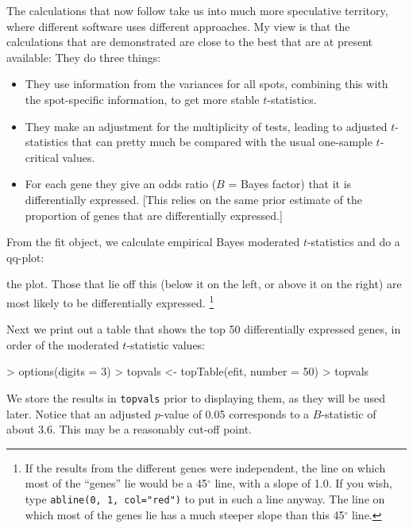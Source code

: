 \documentclass[a4paper,9pt]{article}
\begin{document}
The calculations that now follow take us into much more speculative
territory, where different software uses different approaches.
My view is that the calculations that are demonstrated are close
to the best that are at present available:  They do three things:
\begin{itemize}
\item They use information from the variances for all spots,
combining this with the spot-specific information, to get
more stable $t$-statistics.
\item They make an adjustment for the multiplicity of tests,
leading to adjusted $t$-statistics that can pretty much be
compared with the usual one-sample $t$-critical values.
\item For each gene they give an odds ratio ($B$ = Bayes factor) that
      it is differentially expressed.  [This relies on the same prior
      estimate of the proportion of genes that are differentially
      expressed.]
\end{itemize}

From the fit object, we calculate empirical Bayes moderated 
$t$-statistics and do a qq-plot:
\begin{Schunk}
\end{Schunk}
the plot.  Those that lie off this (below it on the left, or above it
on the right) are most likely to be differentially expressed.
\footnote{If the results from the different genes were independent,
the line on which most of the ``genes'' lie would be a 45$^\circ$
line, with a slope of 1.0.  If you wish, type \texttt{abline(0, 1,
col="red")} to put in such a line anyway. The line on which most of
the genes lie has a much steeper slope than this 45$^\circ$ line.}

Next we print out a table that shows the top 50 differentially
expressed genes, in order of the moderated $t$-statistic values:
\begin{Schunk}
\begin{Sinput}
> options(digits = 3)
> topvals <- topTable(efit, number = 50)
> topvals
\end{Sinput}
\end{Schunk}
We store the results in \texttt{topvals} prior to displaying them,
as they will be used later.  Notice that an adjusted $p$-value of 0.05
corresponds to a $B$-statistic of about 3.6.  This may be a reasonably
cut-off point.
\end{document}
